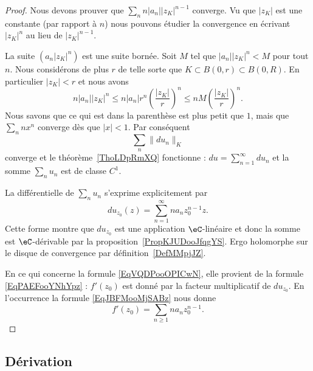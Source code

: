 \begin{proof}
	Nous devons prouver que \( \sum_nn| a_n | |z_K |^{n-1}\) converge. Vu que \( | z_K |\) est une constante (par rapport à \( n\)) nous pouvons étudier la convergence en écrivant \( | z_K |^n\) au lieu de \( | z_K |^{n-1}\).

	La suite \( (a_n| z_K |^n)\) est une suite bornée. Soit \( M\) tel que \( | a_n | |z_K |^n<M\) pour tout \( n\). Nous considérons de plus \( r\) de telle sorte que \( K\subset B(0,r)\subset B(0,R)\). En particulier \( | z_K |<r\) et nous avons
	\begin{equation}
		n| a_n | |z_K |^n\leq n| a_n |r^n\left( \frac{ | z_K | }{ r } \right)^n\leq nM\left( \frac{ | z_K | }{ r } \right)^n.
	\end{equation}
	Nous savons que ce qui est dans la parenthèse est plus petit que \( 1\), mais que \( \sum_nnx^n\) converge dès que \( | x |<1\). Par conséquent
	\begin{equation}
		\sum_n\| du_n \|_K
	\end{equation}
	converge et le théorème~\ref{ThoLDpRmXQ} fonctionne : \( du=\sum_{n=1}^{\infty}du_n\) et la somme \( \sum_nu_n\) est de classe \( C^1\).

	La différentielle de \( \sum_nu_n\) s'exprime explicitement par
	\begin{equation}        \label{EqJBFMooMjSABz}
		du_{z_0}(z)=\sum_{n=1}^{\infty}na_nz_0^{n-1}z.
	\end{equation}
	Cette forme montre que \( du_{z_0}\) est une application \( \eC\)-linéaire et donc la somme est \( \eC\)-dérivable par la proposition~\ref{PropKJUDooJfqgYS}. Ergo holomorphe sur le disque de convergence par définition~\ref{DefMMpjJZ}.

	En ce qui concerne la formule \eqref{EqVQDPooOPICwN}, elle provient de la formule \eqref{EqPAEFooYNhYpz} : \( f'(z_0)\) est donné par la facteur multiplicatif de \( du_{z_0}\). En l'occurrence la formule \eqref{EqJBFMooMjSABz} nous donne
	\begin{equation}
		f'(z_0)=\sum_{n\geq 1}na_nz_0^{n-1}.
	\end{equation}
\end{proof}

\subsection{Dérivation}

